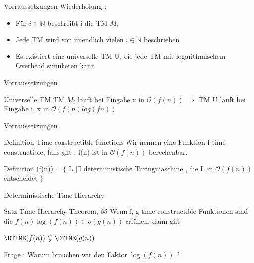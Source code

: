 \begin{frame}{Vorraussetzungen}
	Wiederholung :
	\begin{itemize}[<+->]
		\item Für $i\in \mathbb{N}$ beschreibt i die TM $M_i$
		\item Jede TM wird von unendlich vielen $i\in \mathbb{N}$ beschrieben
		\item Es existiert eine universelle TM U, die jede TM mit logarithmischem Overhead 					simulieren kann
	\end{itemize}
\end{frame}
\begin{frame}{Vorraussetzungen}
	\begin{KITexampleblock}{Universelle TM}
	TM $M_i$ läuft bei Eingabe x in $\mathcal{O}(f(n))$
	$\Rightarrow$ TM U läuft bei Eingabe i, x in $\mathcal{O}(f(n)log(fn))$
	\end{KITexampleblock}
\end{frame}
\begin{frame}{Vorraussetzungen}
	\begin{KITinfoblock}{Definition Time-constructible functions}
		Wir nennen eine Funktion f time-constructible, falls gilt : \newline
		f(n) ist in $\mathcal{O}(f(n))$ berechenbar. 
	\end{KITinfoblock}
	
	\bigskip
	\pause	
	
	\begin{KITinfoblock}{Definition \DTIME }
		\DTIME(f(n)) = $\lbrace$ L $\vert \exists$ deterministische Turingmaschine ,
		 die L in $\mathcal{O}(f(n))$ entscheidet $\rbrace$
	\end{KITinfoblock}
\end{frame}
\begin{frame}{Deterministische Time Hierarchy}
	
	\begin{KITinfoblock}{Satz Time Hierarchy Theorem, 65}
	Wenn f, g  time-constructible Funktionen sind die  
	$f(n)\log(f(n)) \in o(g(n))$ erfüllen, dann gilt

		$\DTIME(f(n)) \subsetneq \DTIME(g(n))$
		
	\end{KITinfoblock}
	
	\pause

	Frage : Warum brauchen wir den Faktor $\log(f(n))$ ?
\end{frame}

